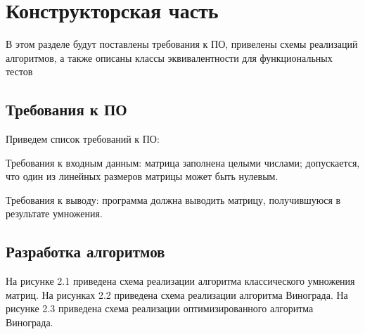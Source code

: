 \chapter{Конструкторская часть}
В этом разделе будут поставлены требования к ПО, привелены схемы реализаций алгоритмов,
а также описаны классы эквивалентности для функциональных тестов


\section{Требования к ПО}
Приведем список требований к ПО:

Требования к входным данным: матрица заполнена целыми числами; допускается, что один из линейных размеров матрицы может быть нулевым.

Требования к выводу:  программа должна выводить матрицу, получившуюся в результате умножения.

\section{Разработка алгоритмов}
На рисунке 2.1 приведена схема реализации алгоритма классического умножения матриц.
На рисунках 2.2 приведена схема реализации алгоритма Винограда.
На рисунке 2.3 приведена схема реализации оптимизированного алгоритма Винограда.

